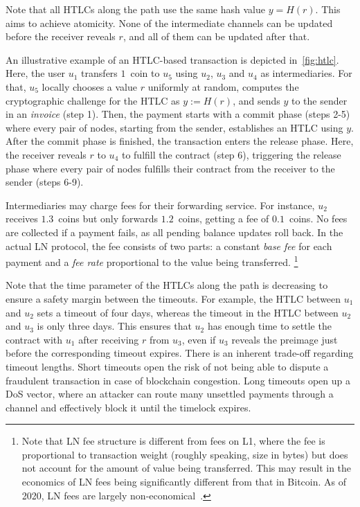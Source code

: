 Note that all HTLCs along the path use the same hash value $y=H(r)$.
This aims to achieve atomicity.
None of the intermediate channels can be updated before the receiver reveals $r$, and all of them can be updated after that.

An illustrative example of an HTLC-based transaction is depicted in~\cref{fig:htlc}.
Here, the user $u_1$ transfers $1$~coin to $u_5$ using $u_2$, $u_3$ and $u_4$ as intermediaries.
For that, $u_5$ locally chooses a value $r$ uniformly at random, computes the cryptographic challenge for the HTLC as $y := H(r)$, and sends $y$ to the sender in an \textit{invoice} (step 1).
Then, the payment starts with a commit phase (steps 2-5) where every pair of nodes, starting from the sender, establishes an HTLC using $y$.
After the commit phase is finished, the transaction enters the release phase.
Here, the receiver reveals $r$ to $u_4$ to fulfill the contract (step 6), triggering the release phase where every pair of nodes fulfills their contract from the receiver to the sender (steps 6-9).

Intermediaries may charge fees for their forwarding service.
For instance, $u_2$ receives $1.3$~coins but only forwards $1.2$~coins, getting a fee of $0.1$~coins.
No fees are collected if a payment fails, as all pending balance updates roll back.
In the actual LN protocol, the fee consists of two parts: a constant \textit{base fee} for each payment and a \textit{fee rate} proportional to the value being transferred.
\footnote{Note that LN fee structure is different from fees on L1, where the fee is proportional to transaction weight (roughly speaking, size in bytes) but does not account for the amount of value being transferred. This may result in the economics of LN fees being significantly different from that in Bitcoin. As of 2020, LN fees are largely non-economical~\cite{Beres2019}.}

Note that the time parameter of the HTLCs along the path is decreasing to ensure a safety margin between the timeouts.
For example, the HTLC between $u_1$ and $u_2$ sets a timeout of four days, whereas the timeout in the HTLC between $u_2$ and $u_3$ is only three days.
This ensures that $u_2$ has enough time to settle the contract with $u_1$ after receiving $r$ from $u_3$, even if $u_3$ reveals the preimage just before the corresponding timeout expires.
There is an inherent trade-off regarding timeout lengths.
Short timeouts open the risk of not being able to dispute a fraudulent transaction in case of blockchain congestion.
Long timeouts open up a DoS vector, where an attacker can route many unsettled payments through a channel and effectively block it until the timelock expires.

